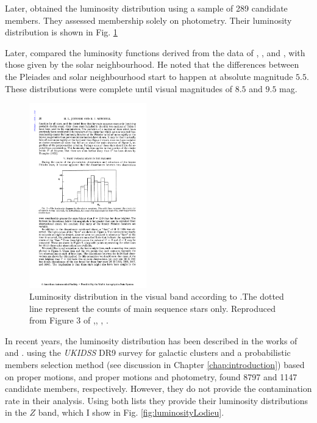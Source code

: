 Later, \citet{Johnson1958} obtained the luminosity distribution using a sample of 289 candidate members. They assessed  membership solely on photometry. Their luminosity distribution is shown in Fig. \ref{fig:luminosityJohnson}

Later, \citet{Limber1962} compared the luminosity functions derived from the data of \citet{Trumpler1921}, \citet{Hertzsprung1947}, and \citet{Johnson1958}, with those given by the solar neighbourhood. He noted that the differences between the Pleiades and solar neighbourhood start to happen at absolute magnitude $5.5$. These distributions were complete until visual magnitudes of $8.5$ and $9.5$ mag. 

\begin{figure}[ht!]
\begin{center}
\includegraphics[height=8cm]{background/Figures/F3_Johnson1958.pdf}
\caption{Luminosity distribution in the visual band according to \citet{Johnson1958}.The dotted line represent the counts of main sequence stars only. Reproduced from Figure 3 of \citet{Johnson1958},\textit{}, , .}
\label{fig:luminosityJohnson}
\end{center}
\end{figure}



In recent years, the luminosity distribution has been described in the works of \citet{Lodieu2012} and \citet{Bouy2015}. 
\citet{Lodieu2012} using the \emph{UKIDSS} DR9 survey for galactic clusters and a probabilistic members selection method (see discussion in Chapter \ref{chap:introduction}) based on proper motions, and proper motions and photometry, found 8797 and 1147 candidate members, respectively. However, they do not provide the contamination rate in their analysis. Using both lists they provide their luminosity distributions in the $Z$ band, which I show in Fig. \ref{fig:luminosityLodieu}.

